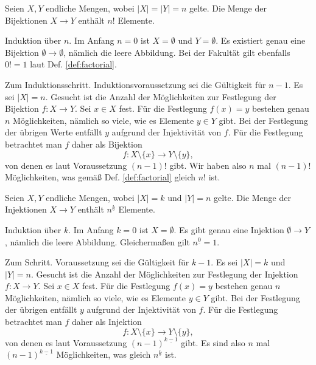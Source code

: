 \begin{Satz}\newlinefirst
Seien $X,Y$ endliche Mengen, wobei $|X|=|Y|=n$ gelte.
Die Menge der Bijektionen $X\to Y$ enthält $n!$ Elemente.
\end{Satz}
\begin{Beweis}
Induktion über $n$. Im Anfang $n=0$ ist $X=\emptyset$
und $Y=\emptyset$. Es existiert genau eine Bijektion
$\emptyset\to\emptyset$, nämlich die leere Abbildung.
Bei der Fakultät gilt ebenfalls $0! = 1$ laut
Def. \ref{def:factorial}.

Zum Induktionsschritt. Induktionsvoraussetzung sei die Gültigkeit für
$n-1$. Es sei $|X|=n$. Gesucht ist die Anzahl der Möglichkeiten zur
Festlegung der Bijektion $f\colon X\to Y$. Sei $x\in X$ fest. Für
die Festlegung $f(x)=y$ bestehen genau $n$ Möglichkeiten, nämlich
so viele, wie es Elemente $y\in Y$ gibt. Bei der Festlegung der übrigen
Werte entfällt $y$ aufgrund der Injektivität von $f$. Für die Festlegung
betrachtet man $f$ daher als Bijektion%
\[f\colon X\setminus\{x\}\to Y\setminus\{y\},\]
von denen es laut Voraussetzung $(n-1)!$ gibt. Wir haben also
$n$ mal $(n-1)!$ Möglichkeiten, was gemäß Def. \ref{def:factorial}
gleich $n!$ ist.\,\qedsymbol
\end{Beweis}

\begin{Satz}\newlinefirst
Seien $X,Y$ endliche Mengen, wobei $|X|=k$ und $|Y|=n$ gelte.
Die Menge der Injektionen $X\to Y$ enthält $n^{\underline k}$
Elemente.
\end{Satz}
\begin{Beweis}
Induktion über $k$. Im Anfang $k=0$ ist $X=\emptyset$. Es gibt
genau eine Injektion $\emptyset\to Y$, nämlich die leere Abbildung.
Gleichermaßen gilt $n^{\underline 0} = 1$.

Zum Schritt. Voraussetzung sei die Gültigkeit
für $k-1$. Es sei $|X|=k$ und $|Y|=n$. Gesucht ist die Anzahl
der Möglichkeiten zur Festlegung der Injektion $f\colon X\to Y$.
Sei $x\in X$ fest. Für die Festlegung $f(x)=y$ bestehen genau
$n$ Möglichkeiten, nämlich so viele, wie es Elemente $y\in Y$ gibt.
Bei der Festlegung der übrigen entfällt $y$ aufgrund der Injektivität
von $f$. Für die Festlegung betrachtet man $f$ daher als Injektion%
\[f\colon X\setminus\{x\}\to Y\setminus\{y\},\]
von denen es laut Voraussetzung $(n-1)^{\underline{k-1}}$ gibt. Es sind
also $n$ mal $(n-1)^{\underline{k-1}}$ Möglichkeiten, was gleich
$n^{\underline k}$ ist.\,\qedsymbol
\end{Beweis}

